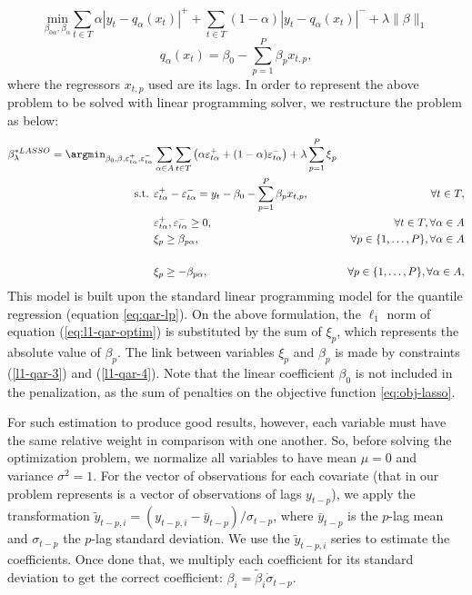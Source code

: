 \begin{equation}
  \underset{\beta_{0\alpha},\beta_\alpha}{\text{min}} \sum_{t \in T}\alpha|y_{t}-q_\alpha(x_t)|^{+}+ \sum_{t \in T}(1-\alpha)|y_{t}-q_\alpha(x_t)|^{-}+\lambda\|\beta\|_{1}
\label{eq:l1-qar-optim}
\end{equation}
\[
q_\alpha(x_t)=\beta_{0}-\sum_{p=1}^{P}\beta_{p}x_{t,p},
\]
where the regressors $x_{t,p}$ used are its lags. In order to represent the above problem to be solved with linear programming solver, we restructure the problem as below:
\begin{eqnarray}
\beta_\lambda^{*LASSO} = \argmin_{\beta_{0},\beta,\varepsilon_{t \alpha}^{+},\varepsilon_{t \alpha}^{-}} & \sum_{\alpha \in A} \sum_{t \in T}\left(\alpha\varepsilon_{t \alpha}^{+}+(1-\alpha)\varepsilon_{t \alpha}^{-}\right)+\lambda\sum_{p=1}^{P}\mbox{\ensuremath{\xi}}_{p} \label{eq:obj-lasso} \\
\mbox{s.t. } & \varepsilon_{t \alpha}^{+}-\varepsilon_{t \alpha}^{-}=y_{t}-\beta_{0}-\sum_{p=1}^{P}\beta_{p}x_{t,p},&\forall t\in T,\\
& \varepsilon_{t \alpha}^{+},\varepsilon_{t \alpha}^{-}\geq0,&\forall t \in T, \forall \alpha \in A\\
& \xi_{p}\geq\beta_{p \alpha},&\forall p\in\{1,\dots,P\}, \forall \alpha \in A  \nonumber\\ \label{l1-qar-3}
\\
& \xi_{p}\geq-\beta_{p \alpha},&\forall p\in\{1,\dots,P\}, \forall \alpha \in A,  \nonumber \\ \label{l1-qar-4}
\end{eqnarray}
This model is built upon the standard linear programming model for the quantile regression (equation \ref{eq:qar-lp}). 
On the above formulation, the $\ell_1$ norm of equation (\ref{eq:l1-qar-optim}) is substituted by the sum of $\xi_p$, which represents the absolute value of $\beta_p$. The link between variables $\xi_p$ and $\beta_p$ is made by constraints (\ref{l1-qar-3}) and (\ref{l1-qar-4}). Note that the linear coefficient $\beta_0$ is not included in the penalization, as the sum of penalties on the objective function \ref{eq:obj-lasso}.

For such estimation to produce good results, however, each variable must have the same relative weight in comparison with one another. So, before solving the optimization problem, we normalize all variables to have mean $\mu = 0$ and variance $\sigma^2 = 1$. For the vector of observations for each covariate (that in our problem represents is a vector of observations of lags $y_{t-p}$), we apply the transformation $\tilde{y}_{t-p,i} = (y_{t-p,i} - \bar{y}_{t-p}) / \sigma_{t-p}$, where $\bar{y}_{t-p}$ is the $p$-lag mean and $\sigma_{t-p}$ the $p$-lag standard deviation. We use the $\tilde{y}_{t-p,i}$ series to estimate the coefficients. Once done that, we multiply each coefficient for its standard deviation to get the correct coefficient: $\beta_i = \tilde{\beta}_i \dot \sigma_{t-p}$.

